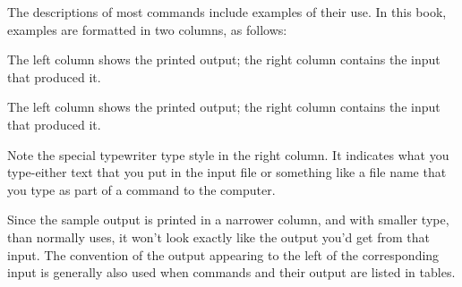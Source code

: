 The descriptions of most commands include examples of their use. In this book, examples are 
formatted in two columns, as follows:

\bigskip
\noindent\parbox{.45\linewidth}{The left column shows the printed output; the right column contains the input that produced it.}
\hspace*{2em}
\parbox{.65\linewidth}{\ttfamily The left column shows the printed output; the right column contains the input that produced it.}
\bigskip

Note the special typewriter type style in the right column. It indicates what
you type-either text that you put in the input file or something like a file name
that you type as part of a command to the computer.

Since the sample output is printed in a narrower column, and with smaller
type, than \ltx{} normally uses, it won't look exactly like the output you'd get
from that input. The convention of the output appearing to the left of the
corresponding input is generally also used when commands and their output are
listed in tables.
